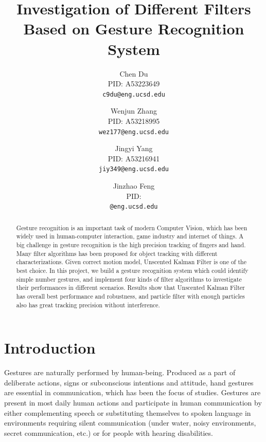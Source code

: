 \documentclass[10pt,twocolumn,letterpaper]{article}
\begin{document}
\title{Investigation of Different Filters Based on Gesture Recognition System}

\author{Chen Du\\
PID: A53223649\\
{\tt\small c9du@eng.ucsd.edu}
\and
Wenjun Zhang\\
PID: A53218995\\
{\tt\small wez177@eng.ucsd.edu}
\and
Jingyi Yang\\
PID: A53216941\\
{\tt\small jiy349@eng.ucsd.edu}
\and
Jinzhao Feng\\
PID: \\
{\tt\small @eng.ucsd.edu}
}

\maketitle

\begin{abstract}
Gesture recognition is an important task of modern Computer Vision, which has been widely used in human-computer interaction, game industry and internet of things. A big challenge in gesture recognition is the high precision tracking of fingers and hand. Many filter algorithms has been proposed for object tracking with different characterizations. Given correct motion model, Unscented Kalman Filter is one of the best choice. In this project, we build a gesture recognition system which could identify simple number gestures, and implement four kinds of filter algorithms to investigate their performances in different scenarios. Results show that Unscented Kalman Filter has overall best performance and robustness, and particle filter with enough particles also has great tracking precision without interference.
\end{abstract}

\section{Introduction}

Gestures are naturally performed by human-being. Produced as a part of deliberate actions, signs or subconscious intentions and attitude, hand gestures are essential in communication, which has been the focus of studies. Gestures are present in most daily human actions and participate in human communication by either complementing speech or substituting themselves to spoken language in environments requiring silent communication (under water, noisy environments, secret communication,
etc.) or for people with hearing disabilities.\cite{ref:escalera}
\end{document}
